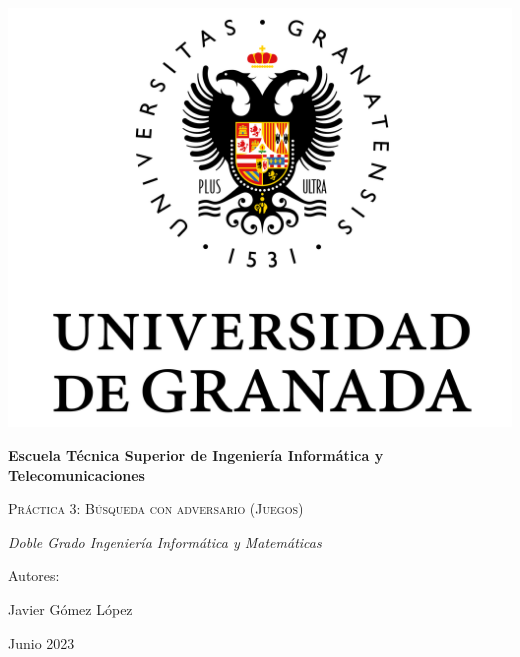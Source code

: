 \documentclass[10pt,a4paper]{article}
\begin{document}
	
\begin{titlepage}
	\centering
	{\includegraphics[scale=0.5]{Logo_UGR.png}\par}
	\vspace{1cm}
	{\bfseries\Large Escuela T\'ecnica Superior de Ingeniería Informática y Telecomunicaciones \par}
	\vspace{2.5cm}
	{\scshape\Huge Pr\'actica 3: Búsqueda con adversario (Juegos) \par}
	\vspace{3cm}
	{\itshape\Large Doble Grado Ingeniería Informática y Matemáticas}
	\vfill
	{\Large Autores: \par}
	{\Large Javier Gómez López \par}
	\vfill
	{\Large Junio 2023 \par}
\end{titlepage}

\thispagestyle{empty}
\null
\vfill
\end{document}
